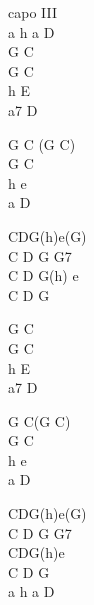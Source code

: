 \begin{chord}
    \ifOneCol \else \small{ \fi
capo III\\
a h a D\\
G C\\
G C\\
h E\\
a7 D

G C (G C)\\
G C\\
h e\\
a D

CDG(h)e(G)\\
C D G G7\\
C D G(h) e\\
C D G

G C\\
G C\\
h E\\
a7 D

G C(G C)\\
G C\\
h e\\
a D

CDG(h)e(G)\\
C D G G7\\
CDG(h)e\\
C D G\\
a h a D
\ifOneCol \else } \fi
\end{chord}





